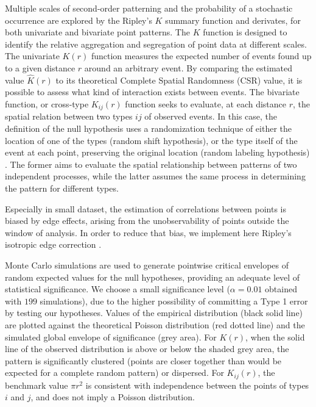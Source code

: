 \documentclass[5p,authoryear]{elsarticle} %
\begin{document}
Multiple scales of second-order patterning and the probability of a stochastic occurrence are explored by the Ripley's $K$ summary function \citep{Ripley1976,Ripley1977} and derivates, for both univariate and bivariate point patterns. The $K$ function is designed to identify the relative aggregation and segregation of point data at different scales. The univariate $K(r)$ function measures the expected number of events found up to a given distance $r$ around an arbitrary event. By comparing the estimated value $\hat{K}(r)$ to its theoretical Complete Spatial Randomness (CSR) value, it is possible to assess what kind of interaction exists between events. The bivariate function, or cross-type $K_{ij}(r)$ function seeks to evaluate, at each distance $r$, the spatial relation between two types $ij$ of observed events. In this case, the definition of the null hypothesis uses a randomization technique of either the location of one of the types (random shift hypothesis), or the type itself of the event at each point, preserving the original location (random labeling hypothesis) \citep{Goreaud2003}. The former aims to evaluate the spatial relationship between patterns of two independent processes, while the latter assumes the same process in determining the pattern for different types.

Especially in small dataset, the estimation of correlations between points is biased by edge effects, arising from the unobservability of points outside the window of analysis. In order to reduce that bias, we implement here Ripley's isotropic edge correction \citep{Ripley1988,Ohser1983}.

Monte Carlo simulations \citep{Robert2004} are used to generate pointwise critical envelopes of random expected values for the null hypotheses, providing an adequate level of statistical significance. We choose a small significance level ($\alpha=0.01$ obtained with $199$ simulations), due to the higher possibility of committing a Type 1 error by testing our hypotheses. Values of the empirical distribution (black solid line) are plotted against the theoretical Poisson distribution (red dotted line) and the simulated global envelope of significance (grey area). For $K(r)$, when the solid line of the observed distribution is above or below the shaded grey area, the pattern is significantly clustered (points are closer together than would be expected for a complete random pattern) or dispersed. For $K_{ij}(r)$, the benchmark value $\pi r^2$ is consistent with independence between the points of types $i$ and $j$, and does not imply a Poisson distribution.
\end{document}
